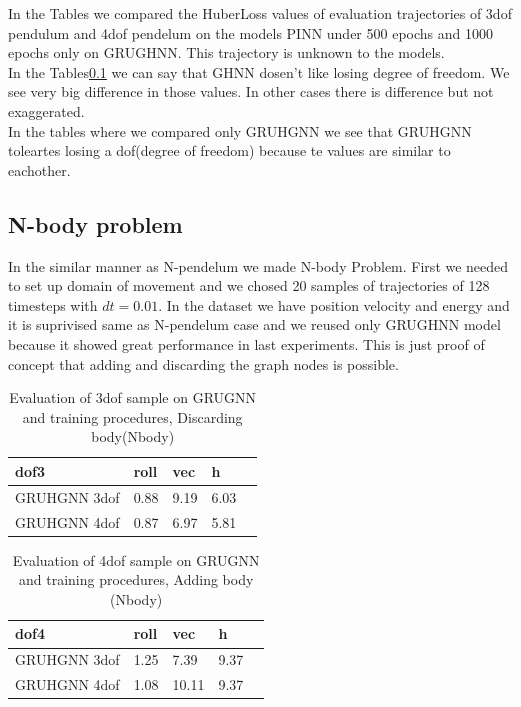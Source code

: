 In the Tables we compared the HuberLoss values of evaluation trajectories of 3dof pendulum and 4dof pendelum on the models PINN under 500 epochs  and 1000 epochs only on GRUGHNN. This trajectory is unknown to the models.\\ 
In the Tables\ref{} we can say that GHNN dosen't like losing degree of freedom. We see very big difference in those values. In other cases there is difference but not exaggerated.\\
In the tables where we compared only GRUHGNN we see that GRUHGNN toleartes losing a dof(degree of freedom) because te values are similar to eachother. 

\subsection{N-body problem}
In the similar manner as N-pendelum we made N-body Problem.
First we needed to set up domain of movement and we chosed 20 samples of trajectories of 128 timesteps with $dt =0.01$. In the dataset we have position velocity and energy and it is suprivised same as N-pendelum case and we reused only GRUGHNN model because it showed great performance in last experiments. This is just proof of concept that adding and discarding the graph nodes is possible.
\begin{table}[h!]
	\centering
	\caption{Evaluation of 3dof sample on GRUGNN and training procedures, Discarding body(Nbody)} %
	\label{tab:my_label}  
\begin{tabular}{|l|l|l|l|l|}
	\hline
	dof3 & roll & vec & h\\  
	\hline
	GRUHGNN 3dof & 0.88 & 9.19 & 6.03 \\  
	\hline
	GRUHGNN 4dof & 0.87 & 6.97 & 5.81 \\  
	\hline
\end{tabular}
\end{table}

\begin{table}[h!]
	\centering
	\caption{Evaluation of 4dof sample on GRUGNN and training procedures, Adding body (Nbody)} %
	\label{tab:my_label}  
\begin{tabular}{|l|l|l|l|l|}
	\hline
	dof4 & roll & vec & h\\  
	\hline
	GRUHGNN 3dof & 1.25 & 7.39 & 9.37 \\  
	\hline
	GRUHGNN 4dof & 1.08 & 10.11 & 9.37 \\  
	\hline
\end{tabular}
\end{table}



